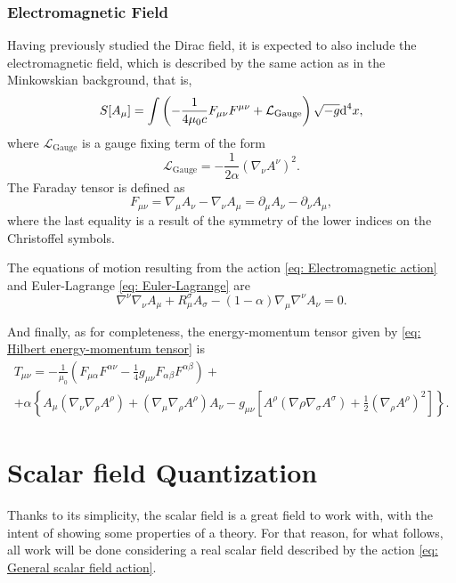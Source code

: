 \subsubsection{Electromagnetic Field}
Having previously studied the Dirac field, it is expected to also include the electromagnetic field, which is described by the same action as in the Minkowskian background, that is,
\begin{equation}\label{eq: Electromagnetic action}
	S[A_\mu]=\int\left(-\frac{1}{4\mu_0 c}F_{\mu\nu}F^{\mu\nu}+\mathcal{L}_{\text{Gauge}}\right)\sqrt{-g}\text{d}^4x,
\end{equation}
where $\mathcal{L}_{\text{Gauge}}$ is a gauge fixing term of the form
\begin{equation}
	\mathcal{L}_{\text{Gauge}}=-\frac{1}{2\alpha}\left(\nabla_\nu A^\nu\right)^2.
\end{equation}
The Faraday tensor is defined as
\begin{equation}
	F_{\mu\nu}=\nabla_\mu A_\nu-\nabla_\nu A_\mu=\partial_\mu A_\nu-\partial_\nu A_\mu,
\end{equation}
where the last equality is a result of the symmetry of the lower indices on the Christoffel symbols.


The equations of motion resulting from the action \ref{eq: Electromagnetic action} and Euler-Lagrange \ref{eq: Euler-Lagrange} are
\begin{equation}
	\nabla^\nu\nabla_\nu A_\mu+R_\mu^\sigma A_\sigma-\left(1-\alpha\right)\nabla_\mu\nabla^\nu A_\nu=0.
\end{equation}

And finally, as for completeness, the energy-momentum tensor given by \ref{eq: Hilbert energy-momentum tensor} is
\begin{multline}
	T_{\mu\nu}=-\frac{1}{\mu_0}\left(F_{\mu\alpha}F^{\alpha\nu}-\frac{1}{4}g_{\mu\nu}F_{\alpha\beta}F^{\alpha\beta}\right)+\\
	+\alpha\left\{A_\mu\left(\nabla_\nu\nabla_\rho A^\rho\right)+\left(\nabla_\mu\nabla_\rho A^\rho\right)A_\nu-g_{\mu\nu}\left[A^\rho\left(\nabla\rho\nabla_\sigma A^\sigma\right)+\frac{1}{2}\left(\nabla_\rho A^\rho\right)^2\right]\right\}.
\end{multline}
\section{Scalar field Quantization}
Thanks to its simplicity, the scalar field is a great field to work with, with the intent of showing some properties of a theory. For that reason, for what follows, all work will be done considering a real scalar field described by the action \ref{eq: General scalar field action}.

